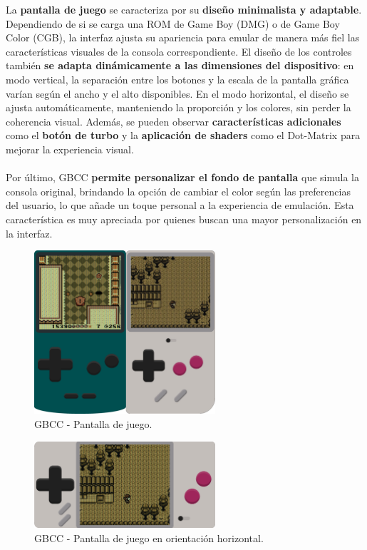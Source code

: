 La \textbf{pantalla de juego} se caracteriza por su \textbf{diseño minimalista y adaptable}. Dependiendo de si se carga una ROM de Game Boy (DMG) o de Game Boy Color (CGB), la interfaz ajusta su apariencia para emular de manera más fiel las características visuales de la consola correspondiente. El diseño de los controles también \textbf{se adapta dinámicamente a las dimensiones del dispositivo}: en modo vertical, la separación entre los botones y la escala de la pantalla gráfica varían según el ancho y el alto disponibles. En el modo horizontal, el diseño se ajusta automáticamente, manteniendo la proporción y los colores, sin perder la coherencia visual. Además, se pueden observar \textbf{características adicionales} como el \textbf{botón de turbo} y la \textbf{aplicación de shaders} como el Dot-Matrix para mejorar la experiencia visual.
\\\\
Por último, GBCC \textbf{permite personalizar el fondo de pantalla} que simula la consola original, brindando la opción de cambiar el color según las preferencias del usuario, lo que añade un toque personal a la experiencia de emulación. Esta característica es muy apreciada por quienes buscan una mayor personalización en la interfaz.

\begin{figure}[h]
    \centering
    \includegraphics[width=0.6\textwidth]{include/images/gbccgame.png}
    \caption{GBCC - Pantalla de juego.}
    \label{figure:gbccgame}
\end{figure}

\begin{figure}[h]
    \centering
    \includegraphics[width=0.6\textwidth]{include/images/gbccgameportrait.png}
    \caption{GBCC - Pantalla de juego en orientación horizontal.}
    \label{figure:gbccgameportrait}
\end{figure}

